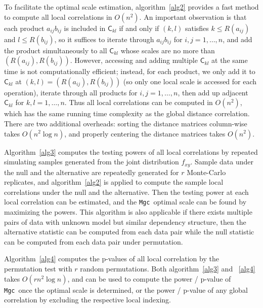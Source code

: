 \documentclass[11pt]{article}
\providecommand{\sct}[1]{{\sc \texttt{#1}}}
\newcommand{\G}{\mathsf{C}}
\newcommand{\Mgc}{\sct{Mgc}}
\begin{document}
To facilitate the optimal scale estimation, algorithm~\ref{alg2} provides a fast method to compute all local correlations in $O(n^2)$. An important observation is that each product $a_{ij}b_{ij}$ is included in $\G_{kl}$ if and only if $(k,l)$ satisfies $k\leq R(a_{ij})$ and $l\leq R(b_{ij})$, so it suffices to iterate through $a_{ij}b_{ij}$ for $i,j=1,\ldots,n$, and add the product simultaneously to all $\G_{kl}$ whose scales are no more than $(R(a_{ij}),R(b_{ij}))$. However, accessing and adding multiple $\G_{kl}$ at the same time is not computationally efficient; instead, for each product, we only add it to $\G_{kl}$ at $(k,l)=(R(a_{ij}),R(b_{ij}))$ (so only one local scale is accessed for each operation), iterate through all products for $i,j=1,\ldots,n$, then add up adjacent $\G_{kl}$ for $k,l=1,\ldots,n$. Thus all local correlations can be computed in $O(n^2)$, which has the same running time complexity as the global distance correlation. There are two additional overheads: sorting the distance matrices column-wise takes $O(n^2 \log n)$, and properly centering the distance matrices takes $O(n^2)$. 

Algorithm~\ref{alg3} computes the testing powers of all local correlations by repeated simulating samples generated from the joint distribution $f_{xy}$. Sample data under the null and the alternative are repeatedly generated for $r$ Monte-Carlo replicates, and algorithm~\ref{alg2} is applied to compute the sample local correlations under the null and the alternative. Then the testing power at each local correlation can be estimated, and the \Mgc~optimal scale can be found by maximizing the powers. This algorithm is also applicable if there exists multiple pairs of data with unknown model but similar dependency structure, then the alternative statistic can be computed from each data pair while the null statistic can be computed from each data pair under permutation.

Algorithm~\ref{alg4} computes the p-values of all local correlation by the permutation test with $r$ random permutations. Both algorithm~\ref{alg3} and ~\ref{alg4} takes $O(rn^2 \log n)$, and can be used to compute the power / p-value of \Mgc~once the optimal scale is determined, or the power / p-value of any global correlation by excluding the respective local indexing.
\end{document}
